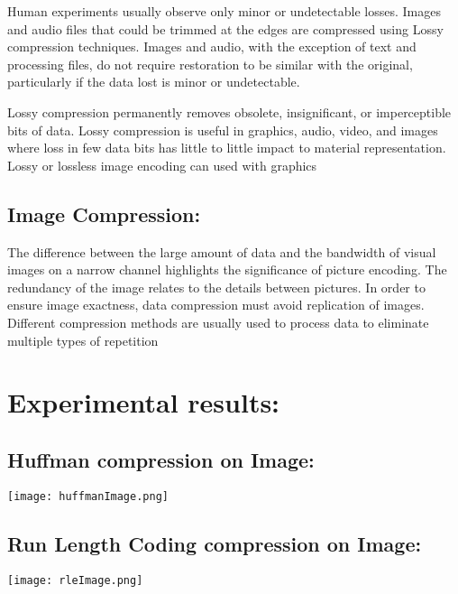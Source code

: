 \documentclass[a4paper, 12pt]{article}
\begin{document}
\par Human experiments usually observe only minor or 
undetectable losses. Images and audio files that could be trimmed at the 
edges are compressed using Lossy compression techniques. Images and 
audio, with the exception of text and processing files, do not require 
restoration to be similar with the original, particularly if the data lost is 
minor or undetectable.
\\
\par Lossy compression permanently removes obsolete, 
insignificant, or imperceptible bits of data. Lossy compression is useful in
graphics, audio, video, and images where loss in few data bits has little to 
little impact to material representation. Lossy or lossless image encoding 
can used with graphics
\\

\subsection{ Image Compression:}
\par The difference between the large amount of data 
and the bandwidth of visual images on a narrow channel highlights the 
significance of picture encoding. The redundancy of the image relates to the 
details between pictures. In order to ensure image exactness, data compression 
must avoid replication of images. Different compression methods are usually 
used to process data to eliminate multiple types of repetition
\\

\newpage
\section{Experimental results:}

\subsection{Huffman compression on Image:}
\texttt{[image: huffmanImage.png]}
\vspace{5mm}

\subsection{Run Length Coding compression on Image:}
\texttt{[image: rleImage.png]}
\vspace{5mm}
\end{document}
